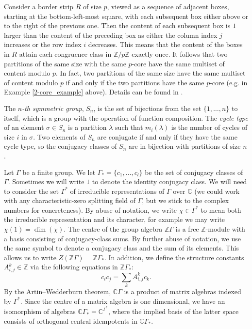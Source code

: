 Consider a border strip $R$ of size $p$, viewed as a sequence of adjacent boxes, starting at the bottom-left-most square, with each subsequent box either above or to the right of the previous one. Then the content of each subsequent box is $1$ larger than the content of the preceding box as either the column index $j$ increases or the row index $i$ decreases. This means that the content of the boxes in $R$ attain each congruence class in $\mathbb{Z}/p\mathbb{Z}$ exactly once. It follows that two partitions of the same size with the same $p$-core have the same multiset of content modulo $p$. In fact, two partitions of the same size have the same multiset of content modulo $p$ if and only if the two partitions have the same $p$-core (e.g. in Example \ref{2-core_example} above). Details can be found in \cite[Examples 8 and 11, Section 1.1]{Macdonald}.

The \emph{$n$-th symmetric group}, $S_n$, is the set of bijections from the set $\{1, \ldots, n\}$ to itself, which is a group with the operation of function composition. The \emph{cycle type} of an element $\sigma \in S_n$ is a partition $\lambda$ such that $m_i(\lambda)$ is the number of cycles of size $i$ in $\sigma$. Two elements of $S_n$ are conjugate if and only if they have the same cycle type, so the conjugacy classes of $S_n$ are in bijection with partitions of size $n$.

Let $\Gamma$ be a finite group. We let $\Gamma_* = \{c_1, \ldots, c_l\}$ be the set of conjugacy classes of $\Gamma$. Sometimes we will write $1$ to denote the identity conjugacy class. We will need to consider the set $\Gamma^*$ of irreducible representations of $\Gamma$ over $\mathbb{C}$ (we could work with any characteristic-zero splitting field of $\Gamma$, but we stick to the complex numbers for concreteness). By abuse of notation, we write $\chi \in \Gamma^*$ to mean both the irreducible representation and its character, for example we may write $\chi(1) = \dim(\chi)$. The centre of the group algebra $\mathbb{Z}\Gamma$ is a free $\mathbb{Z}$-module with a basis consisting of conjugacy-class sums. By further abuse of notation, we use the same symbol to denote a conjugacy class and the sum of its elements. This allows us to write $Z(\mathbb{Z}\Gamma) = \mathbb{Z}\Gamma_*$. In addition, we define the structure constants $A_{i,j}^k \in \mathbb{Z}$ via the following equations in $\mathbb{Z}\Gamma_*$:
\begin{equation} \label{gp_alg_centre_str_consts}
c_i c_j = \sum_k A_{i,j}^k c_k.
\end{equation}
By the Artin--Wedderburn theorem, $\mathbb{C}\Gamma$ is a product of matrix algebras indexed by $\Gamma^*$. Since the centre of a matrix algebra is one dimensional, we have an isomorphism of algebras $\mathbb{C}\Gamma_* = \mathbb{C}^{\Gamma^*}$, where the implied basis of the latter space consists of orthogonal central idempotents in $\mathbb{C}\Gamma_*$.


